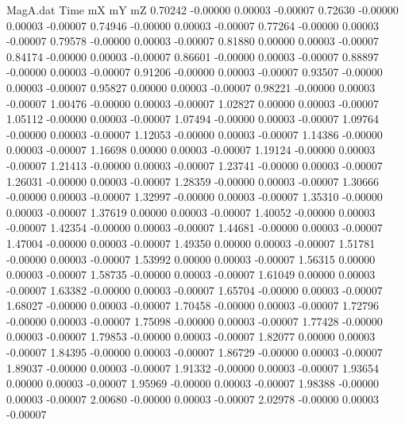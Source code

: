 \begin{filecontents}{MagA.dat}
Time mX mY mZ
   0.70242   -0.00000    0.00003   -0.00007
   0.72630   -0.00000    0.00003   -0.00007
   0.74946   -0.00000    0.00003   -0.00007
   0.77264   -0.00000    0.00003   -0.00007
   0.79578   -0.00000    0.00003   -0.00007
   0.81880    0.00000    0.00003   -0.00007
   0.84174   -0.00000    0.00003   -0.00007
   0.86601   -0.00000    0.00003   -0.00007
   0.88897   -0.00000    0.00003   -0.00007
   0.91206   -0.00000    0.00003   -0.00007
   0.93507   -0.00000    0.00003   -0.00007
   0.95827    0.00000    0.00003   -0.00007
   0.98221   -0.00000    0.00003   -0.00007
   1.00476   -0.00000    0.00003   -0.00007
   1.02827    0.00000    0.00003   -0.00007
   1.05112   -0.00000    0.00003   -0.00007
   1.07494   -0.00000    0.00003   -0.00007
   1.09764   -0.00000    0.00003   -0.00007
   1.12053   -0.00000    0.00003   -0.00007
   1.14386   -0.00000    0.00003   -0.00007
   1.16698    0.00000    0.00003   -0.00007
   1.19124   -0.00000    0.00003   -0.00007
   1.21413   -0.00000    0.00003   -0.00007
   1.23741   -0.00000    0.00003   -0.00007
   1.26031   -0.00000    0.00003   -0.00007
   1.28359   -0.00000    0.00003   -0.00007
   1.30666   -0.00000    0.00003   -0.00007
   1.32997   -0.00000    0.00003   -0.00007
   1.35310   -0.00000    0.00003   -0.00007
   1.37619    0.00000    0.00003   -0.00007
   1.40052   -0.00000    0.00003   -0.00007
   1.42354   -0.00000    0.00003   -0.00007
   1.44681   -0.00000    0.00003   -0.00007
   1.47004   -0.00000    0.00003   -0.00007
   1.49350    0.00000    0.00003   -0.00007
   1.51781   -0.00000    0.00003   -0.00007
   1.53992    0.00000    0.00003   -0.00007
   1.56315    0.00000    0.00003   -0.00007
   1.58735   -0.00000    0.00003   -0.00007
   1.61049    0.00000    0.00003   -0.00007
   1.63382   -0.00000    0.00003   -0.00007
   1.65704   -0.00000    0.00003   -0.00007
   1.68027   -0.00000    0.00003   -0.00007
   1.70458   -0.00000    0.00003   -0.00007
   1.72796   -0.00000    0.00003   -0.00007
   1.75098   -0.00000    0.00003   -0.00007
   1.77428   -0.00000    0.00003   -0.00007
   1.79853   -0.00000    0.00003   -0.00007
   1.82077    0.00000    0.00003   -0.00007
   1.84395   -0.00000    0.00003   -0.00007
   1.86729   -0.00000    0.00003   -0.00007
   1.89037   -0.00000    0.00003   -0.00007
   1.91332   -0.00000    0.00003   -0.00007
   1.93654    0.00000    0.00003   -0.00007
   1.95969   -0.00000    0.00003   -0.00007
   1.98388   -0.00000    0.00003   -0.00007
   2.00680   -0.00000    0.00003   -0.00007
   2.02978   -0.00000    0.00003   -0.00007

\end{filecontents}
